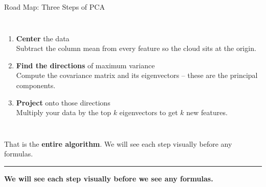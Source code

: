 \documentclass[8pt,aspectratio=169]{beamer}
\newcommand{\bottomnote}[1]{%
\vfill
\vspace{-2mm}
\textcolor{mllavender2}{\rule{\textwidth}{0.4pt}}
\vspace{1mm}
\footnotesize
\textbf{#1}
}
\newcommand{\highlight}[1]{\textcolor{mlorange}{\textbf{#1}}}
\begin{document}
\begin{frame}[t]{Road Map: Three Steps of PCA}
\begin{columns}[T]
\small
\begin{enumerate}
\setlength{\itemsep}{8pt}
\item \highlight{Center} the data\\
{\scriptsize Subtract the column mean from every feature so the cloud sits at the origin.}

\item \highlight{Find the directions} of maximum variance\\
{\scriptsize Compute the covariance matrix and its eigenvectors -- these are the principal components.}

\item \highlight{Project} onto those directions\\
{\scriptsize Multiply your data by the top $k$ eigenvectors to get $k$ new features.}
\end{enumerate}

\vspace{4mm}
\end{columns}

\vspace{3mm}
\begin{block}{}
\small That is the \highlight{entire algorithm}. We will see each step visually before any formulas.
\end{block}

\bottomnote{We will see each step visually before we see any formulas.}
\end{frame}
\end{document}
